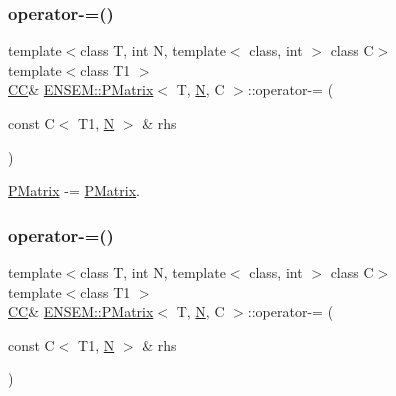 \subsubsection{\texorpdfstring{operator-\/=()}{operator-=()}\hspace{0.1cm}{\footnotesize\ttfamily [1/6]}}
{\footnotesize\ttfamily template$<$class T, int N, template$<$ class, int $>$ class C$>$ \\
template$<$class T1 $>$ \\
\mbox{\hyperlink{classENSEM_1_1PMatrix_a744bac549029029effe32dc1705660ec}{CC}}\& \mbox{\hyperlink{classENSEM_1_1PMatrix}{E\+N\+S\+E\+M\+::\+P\+Matrix}}$<$ T, \mbox{\hyperlink{adat__devel_2lib_2hadron_2operator__name__util_8cc_a7722c8ecbb62d99aee7ce68b1752f337}{N}}, C $>$\+::operator-\/= (\begin{DoxyParamCaption}\item[{const C$<$ T1, \mbox{\hyperlink{adat__devel_2lib_2hadron_2operator__name__util_8cc_a7722c8ecbb62d99aee7ce68b1752f337}{N}} $>$ \&}]{rhs }\end{DoxyParamCaption})\hspace{0.3cm}{\ttfamily [inline]}}



\mbox{\hyperlink{classENSEM_1_1PMatrix}{P\+Matrix}} -\/= \mbox{\hyperlink{classENSEM_1_1PMatrix}{P\+Matrix}}. 

\mbox{\label{classENSEM_1_1PMatrix_a76fa178c64fa75b73925016654a08766}} 
\subsubsection{\texorpdfstring{operator-\/=()}{operator-=()}\hspace{0.1cm}{\footnotesize\ttfamily [2/6]}}
{\footnotesize\ttfamily template$<$class T, int N, template$<$ class, int $>$ class C$>$ \\
template$<$class T1 $>$ \\
\mbox{\hyperlink{classENSEM_1_1PMatrix_a744bac549029029effe32dc1705660ec}{CC}}\& \mbox{\hyperlink{classENSEM_1_1PMatrix}{E\+N\+S\+E\+M\+::\+P\+Matrix}}$<$ T, \mbox{\hyperlink{adat__devel_2lib_2hadron_2operator__name__util_8cc_a7722c8ecbb62d99aee7ce68b1752f337}{N}}, C $>$\+::operator-\/= (\begin{DoxyParamCaption}\item[{const C$<$ T1, \mbox{\hyperlink{adat__devel_2lib_2hadron_2operator__name__util_8cc_a7722c8ecbb62d99aee7ce68b1752f337}{N}} $>$ \&}]{rhs }\end{DoxyParamCaption})\hspace{0.3cm}{\ttfamily [inline]}}



